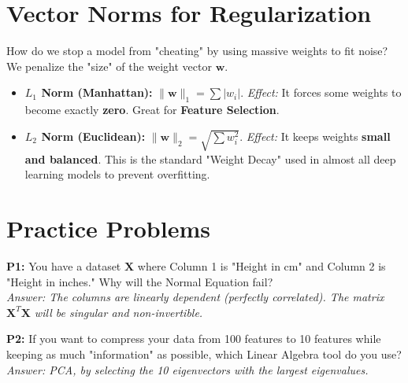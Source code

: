 \documentclass{article}
\begin{document}
\section{Vector Norms for Regularization}
How do we stop a model from "cheating" by using massive weights to fit noise? We penalize the "size" of the weight vector $\mathbf{w}$.

\begin{itemize}
    \item \textbf{$L_1$ Norm (Manhattan):} $\|\mathbf{w}\|_1 = \sum |w_i|$. 
    \textit{Effect:} It forces some weights to become exactly \textbf{zero}. Great for \textbf{Feature Selection}.
    \item \textbf{$L_2$ Norm (Euclidean):} $\|\mathbf{w}\|_2 = \sqrt{\sum w_i^2}$. 
    \textit{Effect:} It keeps weights \textbf{small and balanced}. This is the standard "Weight Decay" used in almost all deep learning models to prevent overfitting.
\end{itemize}

\section{Practice Problems}
\textbf{P1:} You have a dataset $\mathbf{X}$ where Column 1 is "Height in cm" and Column 2 is "Height in inches." Why will the Normal Equation fail? \\
\textit{Answer: The columns are linearly dependent (perfectly correlated). The matrix $\mathbf{X}^T\mathbf{X}$ will be singular and non-invertible.}

\textbf{P2:} If you want to compress your data from 100 features to 10 features while keeping as much "information" as possible, which Linear Algebra tool do you use? \\
\textit{Answer: PCA, by selecting the 10 eigenvectors with the largest eigenvalues.}
\end{document}
